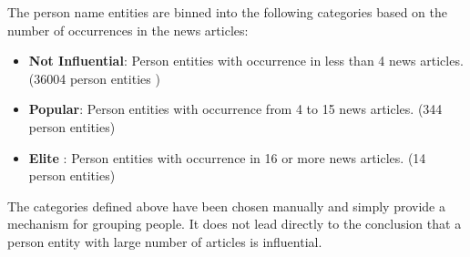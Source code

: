 The person name entities are binned into the following categories based on the number of occurrences in the news articles:
\begin{itemize}
 \item \textbf{Not Influential}: Person entities with occurrence in less than 4 news articles. (36004 person entities )
\item \textbf{Popular}: Person entities with occurrence from 4 to 15 news articles. (344 person entities) 
\item \textbf{Elite} : Person entities with occurrence in 16 or more news articles. (14 person entities)
\end{itemize}
The categories defined above have been chosen manually and simply provide a mechanism for grouping people. It does not lead directly to the conclusion that a person entity with large number of articles is influential.



